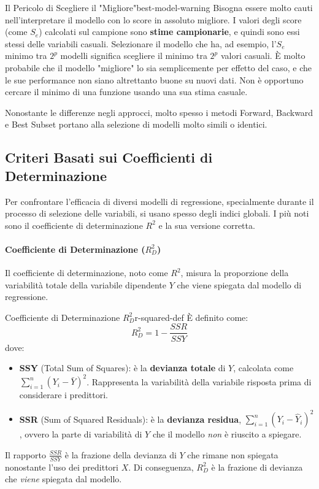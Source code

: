 \begin{nota}{Il Pericolo di Scegliere il "Migliore"}{best-model-warning}
Bisogna essere molto cauti nell'interpretare il modello con lo score in assoluto
migliore. I valori degli score (come \(S_e\)) calcolati sul campione sono
\textbf{stime campionarie}, e quindi sono essi stessi delle variabili casuali.
Selezionare il modello che ha, ad esempio, l'\(S_e\) minimo tra \(2^p\) modelli
significa scegliere il minimo tra \(2^p\) valori casuali. È molto probabile che
il modello "migliore" lo sia semplicemente per effetto del caso, e che le sue
performance non siano altrettanto buone su nuovi dati. Non è opportuno cercare
il minimo di una funzione usando una sua stima casuale.
\end{nota}

Nonostante le differenze negli approcci, molto spesso i metodi Forward, Backward
e Best Subset portano alla selezione di modelli molto simili o identici.

\subsection{Criteri Basati sui Coefficienti di Determinazione}
Per confrontare l'efficacia di diversi modelli di regressione, specialmente
durante il processo di selezione delle variabili, si usano spesso degli indici
globali. I più noti sono il coefficiente di determinazione \(R^2\) e la sua
versione corretta.

\paragraph{Coefficiente di Determinazione (\(R^2_D\))}
Il coefficiente di determinazione, noto come \(R^2\), misura la proporzione
della variabilità totale della variabile dipendente \(Y\) che viene spiegata
dal modello di regressione.

\begin{definizione}{Coefficiente di Determinazione \(R^2_D\)}{r-squared-def}
È definito come:
\[
    R_D^2 = 1 - \frac{SSR}{SSY}
\]
dove:
\begin{itemize}
    \item \textbf{SSY} (Total Sum of Squares): è la \textbf{devianza totale} di
    \(Y\), calcolata come \( \sum_{i=1}^{n} (Y_i - \bar{Y})^2 \). Rappresenta la
    variabilità della variabile risposta prima di considerare i predittori.
    \item \textbf{SSR} (Sum of Squared Residuals): è la \textbf{devianza
    residua}, \( \sum_{i=1}^{n} (Y_i - \hat{Y}_i)^2 \), ovvero la parte di
    variabilità di \(Y\) che il modello \textit{non} è riuscito a spiegare.
\end{itemize}
Il rapporto \( \frac{SSR}{SSY} \) è la frazione della devianza di \(Y\) che
rimane non spiegata nonostante l'uso dei predittori \(X\). Di conseguenza,
\(R_D^2\) è la frazione di devianza che \textit{viene} spiegata dal modello.
\end{definizione}

